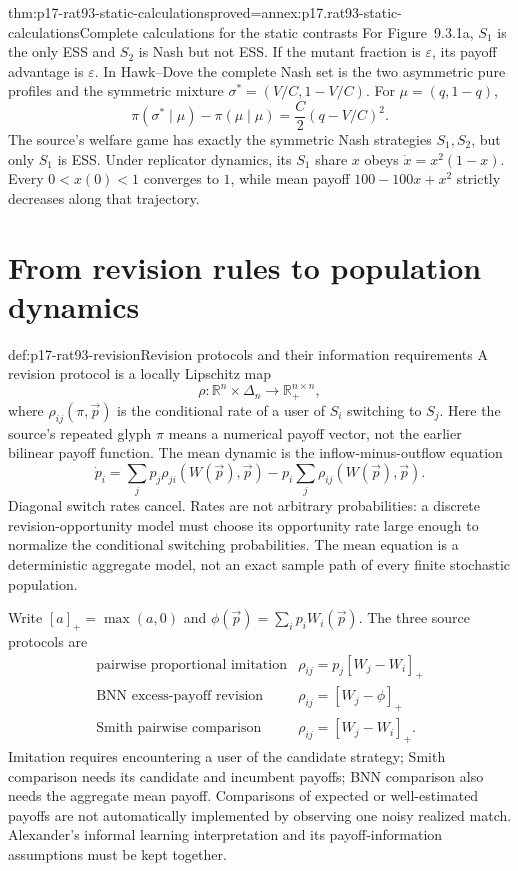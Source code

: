 \begin{hbtheorem}{thm:p17-rat93-static-calculations}{proved=annex:p17.rat93-static-calculations}{Complete calculations for the static contrasts}
For Figure~9.3.1a, \(S_1\) is the only ESS and \(S_2\) is Nash
but not ESS. If the mutant fraction is \(\varepsilon\), its payoff
advantage is \(\varepsilon\).
In Hawk--Dove the complete Nash set is the two asymmetric pure
profiles and the symmetric mixture \(\sigma^*=(V/C,1-V/C)\).
For \(\mu=(q,1-q)\),
\[
 \pi(\sigma^*\mid\mu)-\pi(\mu\mid\mu)
       =\frac C2(q-V/C)^2.
\]
The source's welfare game has exactly the symmetric Nash strategies
\(S_1,S_2\), but only \(S_1\) is ESS. Under replicator dynamics,
its \(S_1\) share \(x\) obeys \(\dot x=x^2(1-x)\). Every
\(0<x(0)<1\) converges to \(1\), while mean payoff
\(100-100x+x^2\) strictly decreases along that trajectory.
\end{hbtheorem}

\section{From revision rules to population dynamics}
\label{sec:p17-rat93-dynamics}

\begin{hbdefinition}{def:p17-rat93-revision}{Revision protocols and their information requirements}
A revision protocol is a locally Lipschitz map
\[
 \rho:\mathbb R^n\times\Delta_n\longrightarrow\mathbb R_+^{n\times n},
\]
where \(\rho_{ij}(\pi,\vec p)\) is the conditional rate of a user
of \(S_i\) switching to \(S_j\). Here the source's repeated glyph
\(\pi\) means a numerical payoff vector, not the earlier bilinear
payoff function. The mean dynamic is the inflow-minus-outflow equation
\[
 \dot p_i=\sum_jp_j\rho_{ji}(W(\vec p),\vec p)
            -p_i\sum_j\rho_{ij}(W(\vec p),\vec p).
\]
Diagonal switch rates cancel. Rates are not arbitrary probabilities:
a discrete revision-opportunity model must choose its opportunity rate
large enough to normalize the conditional switching probabilities.
The mean equation is a deterministic aggregate model, not an exact
sample path of every finite stochastic population.

Write \([a]_+=\max(a,0)\) and
\(\phi(\vec p)=\sum_ip_iW_i(\vec p)\). The three source protocols are
\[
\begin{array}{c|c}
 \text{pairwise proportional imitation}&
 \rho_{ij}=p_j[W_j-W_i]_+\\
 \text{BNN excess-payoff revision}&
 \rho_{ij}=[W_j-\phi]_+\\
 \text{Smith pairwise comparison}&
 \rho_{ij}=[W_j-W_i]_+.
\end{array}
\]
Imitation requires encountering a user of the candidate strategy;
Smith comparison needs its candidate and incumbent payoffs; BNN
comparison also needs the aggregate mean payoff. Comparisons of
expected or well-estimated payoffs are not automatically implemented
by observing one noisy realized match. Alexander's informal learning
interpretation and its payoff-information assumptions must be kept
together.
\end{hbdefinition}

